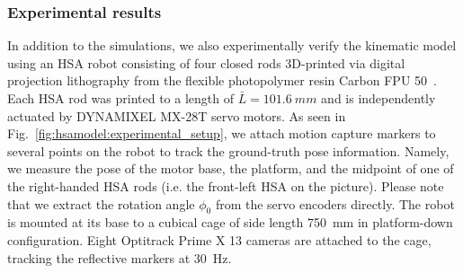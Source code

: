     

\subsubsection{Experimental results}\label{ssub:hsamodel:hsa_rod_kinematics:experimental_results}
In addition to the simulations, we also experimentally verify the kinematic model using an \gls{HSA} robot consisting of four closed rods 3D-printed via digital projection lithography from the flexible photopolymer resin Carbon FPU 50~\citep{truby2021recipe}. Each \gls{HSA} rod was printed to a length of $\bar{L} = \SI{101.6}{mm}$ and is independently actuated by DYNAMIXEL MX-28T servo motors.
As seen in Fig.~\ref{fig:hsamodel:experimental_setup}, we attach motion capture markers to several points on the robot to track the ground-truth pose information. Namely, we measure the pose of the motor base, the platform, and the midpoint of one of the right-handed \gls{HSA} rods (i.e. the front-left \gls{HSA} on the picture). Please note that we extract the rotation angle $\phi_0$ from the servo encoders directly. The robot is mounted at its base to a cubical cage of side length \SI{750}{mm} in platform-down configuration. Eight Optitrack Prime X 13 cameras are attached to the cage, tracking the reflective markers at \SI{30}{Hz}.

